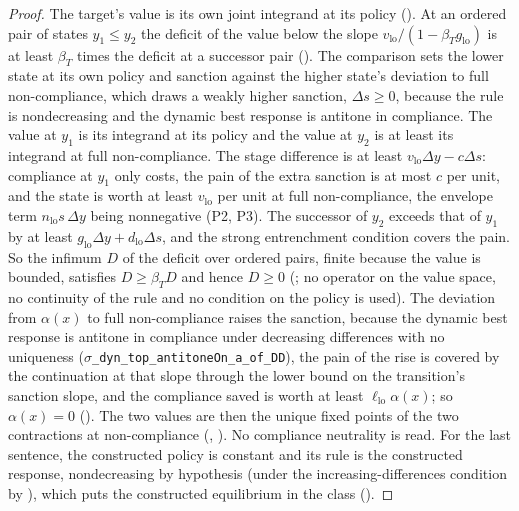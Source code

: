 \begin{proof}
The target's value is
its own joint integrand at its policy (). At an ordered
pair of states $y_1\le y_2$ the deficit of the value below the slope
$v_{\mathrm{lo}}/(1-\beta_Tg_{\mathrm{lo}})$ is at least $\beta_T$ times the deficit
at a successor pair (). The comparison sets the lower state
at its own policy and sanction against the higher state's deviation to full
non-compliance, which draws a weakly higher sanction, $\Delta s\ge0$, because the rule is
nondecreasing and the dynamic best response is antitone in compliance. The value at
$y_1$ is its integrand at its policy and the value at $y_2$ is at least its
integrand at full non-compliance. The stage difference is at least
$v_{\mathrm{lo}}\Delta y-c\Delta s$: compliance at $y_1$ only costs, the pain of the
extra sanction is at most $c$ per unit, and the state is worth at least
$v_{\mathrm{lo}}$ per unit at full non-compliance, the envelope term
$n_{\mathrm{lo}}s\,\Delta y$ being nonnegative (P2, P3). The successor of $y_2$
exceeds that of $y_1$ by at least $g_{\mathrm{lo}}\Delta y+d_{\mathrm{lo}}\Delta s$,
and the strong entrenchment condition covers the pain. So the infimum $D$ of the deficit over ordered pairs, finite because
the value is bounded, satisfies $D\ge\beta_TD$ and hence $D\ge0$
(; no operator on the value space, no
continuity of the rule and no condition on the policy is used). The deviation from $\alpha(x)$ to full
non-compliance raises the sanction, because the dynamic best response is antitone in
compliance under decreasing differences with no uniqueness
(\texttt{$\sigma$\_dyn\_top\_antitoneOn\_a\_of\_DD}), the pain of the rise is
covered by the continuation at that slope through the lower bound on the transition's sanction slope,
and the compliance saved is worth at least $\ell_{\mathrm{lo}}\alpha(x)$; so $\alpha(x)=0$
(). The two values are then the unique
fixed points of the two contractions at non-compliance
(, ). No
compliance neutrality is read. For the last sentence, the constructed policy
is constant and its rule is the constructed response, nondecreasing by
hypothesis (under the increasing-differences condition by ),
which puts the constructed equilibrium in the class
().
\end{proof}

